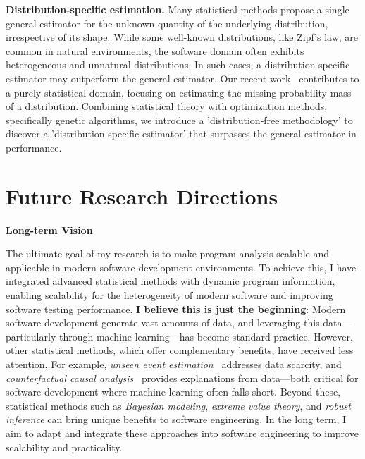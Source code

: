 \documentclass{article}
\begin{document}
\vspace{0.5em}
\noindent\textbf{Distribution-specific estimation.}
Many statistical methods propose a single general estimator for the unknown quantity of the underlying distribution, irrespective of its shape. While some well-known distributions, like Zipf's law, are common in natural environments, the software domain often exhibits heterogeneous and unnatural distributions. In such cases, a distribution-specific estimator may outperform the general estimator. Our recent work~\cite{leeHowMuchUnseen2024} contributes to a purely statistical domain, focusing on estimating the missing probability mass of a distribution. Combining statistical theory with optimization methods, specifically genetic algorithms, we introduce a 'distribution-free methodology' to discover a 'distribution-specific estimator' that surpasses the general estimator in performance.


\section{Future Research Directions}


\noindent\textbf{Long-term Vision}
\vspace{0.5em}

\noindent The ultimate goal of my research is to make program analysis scalable and applicable in modern software development environments. To achieve this, I have integrated advanced statistical methods with dynamic program information, enabling scalability for the heterogeneity of modern software and improving software testing performance. \textbf{I believe this is just the beginning}: Modern software development generate vast amounts of data, and leveraging this data—particularly through machine learning—has become standard practice. However, other statistical methods, which offer complementary benefits, have received less attention. For example, \emph{unseen event estimation}~\cite{leeStatisticalReachabilityAnalysis2023,leeHowMuchUnseen2024,leeStructureawareResidualRisk2025,leeAccountingMissingEvents2025,liyanageExtrapolatingCoverageRate2024} addresses data scarcity, and \emph{counterfactual causal analysis}~\cite{leeObservationbasedApproximateDependency2021,leeCausalProgramDependence2025a,leeEvaluatingLexicalApproximation2020,ohEffectivelySamplingHigher2021} provides explanations from data—both critical for software development where machine learning often falls short. Beyond these, statistical methods such as \emph{Bayesian modeling}, \emph{extreme value theory}, and \emph{robust inference} can bring unique benefits to software engineering. In the long term, I aim to adapt and integrate these approaches into software engineering to improve scalability and practicality.
\end{document}
